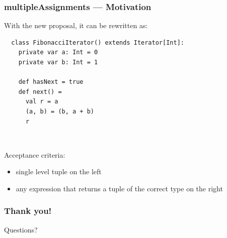 \documentclass{beamer}
\begin{document}
\begin{frame}[fragile]
  \frametitle{multipleAssignments --- Motivation}

  With the new proposal, it can be rewritten as:

  \begin{lstlisting}
  class FibonacciIterator() extends Iterator[Int]:
    private var a: Int = 0
    private var b: Int = 1
  
    def hasNext = true
    def next() =
      val r = a
      (a, b) = (b, a + b)
      r
  \end{lstlisting}
  
  \pause\

  Acceptance criteria:
  \begin{itemize}
    \item single level tuple on the left
    \item any expression that returns a tuple of the correct type on the right
  \end{itemize}

\end{frame}

\begin{frame}
  \frametitle{Thank you!}
  \begin{center}
    \Huge
    Questions?
  \end{center}
\end{frame}
\end{document}
